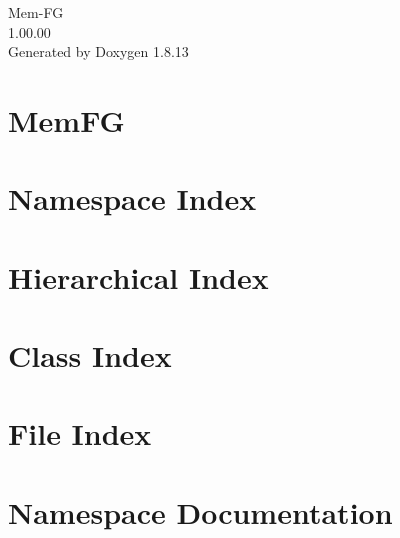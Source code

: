 \documentclass[twoside]{book}
\newcommand{\+}{\discretionary{\mbox{\scriptsize$\hookleftarrow$}}{}{}}
\newcommand{\clearemptydoublepage}{%
  \newpage{\pagestyle{empty}\cleardoublepage}%
}
\begin{document}
\hypersetup{pageanchor=false,
             bookmarksnumbered=true,
             pdfencoding=unicode
            }
\begin{titlepage}
\vspace*{7cm}
\begin{center}%
{\Large Mem-\/\+FG \\[1ex]\large 1.\+00.\+00 }\\
\vspace*{1cm}
{\large Generated by Doxygen 1.8.13}\\
\end{center}
\end{titlepage}
\clearemptydoublepage
{}
\tableofcontents
\clearemptydoublepage
{}
\hypersetup{pageanchor=true}

\chapter{Mem\+FG}
\label{index}\hypertarget{index}{}
\chapter{Namespace Index}

\chapter{Hierarchical Index}

\chapter{Class Index}

\chapter{File Index}

\chapter{Namespace Documentation}














\end{document}
